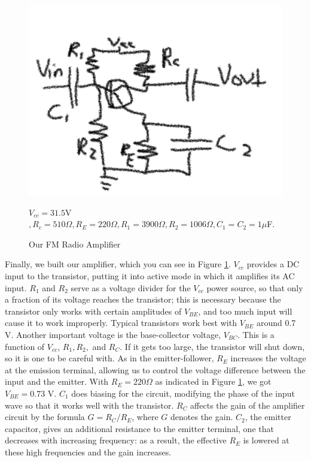 \documentclass[11pt]{article}
\begin{document}
\begin{figure}
\includegraphics[scale=0.8]{amp}
\caption{Our FM Radio Amplifier \label{FMRA}}

$V_{cc} = 31.5 $V$, R_c = 510\Omega, R_E = 220\Omega, R_1 = 3900 \Omega, R_2 = 1006\Omega, C_1 = C_2 = 1\mu$F.
\end{figure}
Finally, we built our amplifier, which you can see in Figure \ref{FMRA}. $V_{cc}$ provides a DC input to the 
transistor, putting it into active mode in which it amplifies its AC input. $R_1$ and $R_2$ serve as a voltage
divider for the $V_{cc}$ power source, so that only a fraction of its voltage reaches the transistor; this
is necessary because the transistor only works with certain amplitudes of $V_{BE}$, and too much input will cause it 
to work improperly. Typical transistors work best with $V_{BE}$ around 0.7 V. Another important voltage is the base-collector
voltage, $V_{BC}$. This is a function of $V_{cc}$, $R_1, R_2, $ and $R_C$. If it gets too large, the transistor will shut
down, so it is one to be careful with. As in the
emitter-follower, $R_E$ increases the voltage at the emission terminal, allowing us to control the voltage difference
between the input and the emitter. With $R_E = 220\Omega$ as indicated in Figure \ref{FMRA}, we got $V_{BE} = 0.73$ V. $C_1$
does biasing for the circuit, modifying the phase of the input wave so that it works well with the transistor. 
$R_C$ affects the gain of the amplifier circuit by the formula $G = R_C / R_E$, where $G$ denotes the gain. 
$C_2$, the emitter capacitor, gives an additional resistance to the emitter terminal, one that decreases with increasing
frequency: as a result, the effective $R_E$ is lowered at these high frequencies and the gain increases.
\end{document}
